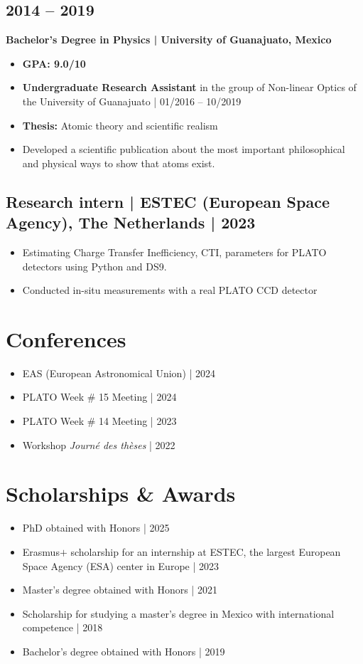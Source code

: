 \documentclass[11pt,a4paper]{article}
\begin{document}
\begin{multicols}{2}
		\subsection{2014 – 2019}
		\textbf{Bachelor's Degree in Physics | University of Guanajuato, Mexico}
		\begin{itemize}
			\item \textbf{GPA: 9.0/10}
			\item \textbf{Undergraduate Research Assistant} in the group of Non-linear Optics of the University of Guanajuato | 01/2016 – 10/2019
			\item \textbf{Thesis:} Atomic theory and scientific realism
			\item Developed a scientific publication about the most important philosophical and physical ways to show that atoms exist. 
		\end{itemize}
		
		\subsection{Research intern | ESTEC (European Space Agency), The Netherlands | 2023}
		\begin{itemize}
			\item Estimating Charge Transfer Inefficiency, CTI, parameters for PLATO detectors using Python and DS9.
			\item Conducted in-situ measurements with a real PLATO CCD detector
		\end{itemize}
	\end{multicols}
	
	\section{Conferences}

		\begin{itemize}
			\item EAS (European Astronomical Union) | 2024
			\item PLATO Week \# 15 Meeting | 2024
			\item PLATO Week \# 14 Meeting | 2023
			\item Workshop \textit{Journé des thèses} | 2022
		\end{itemize}

	
	\section{Scholarships \& Awards}
	\begin{itemize}
		\item PhD obtained with Honors | 2025
		\item Erasmus$+$ scholarship for an internship at ESTEC, the largest European Space Agency (ESA) center in Europe | 2023
		\item Master's degree obtained with Honors | 2021
		\item Scholarship for studying a master's degree in Mexico with international competence | 2018
		\item Bachelor's degree obtained with Honors | 2019
	\end{itemize}
	
\end{document}
